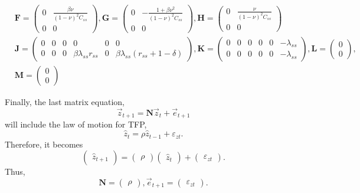 \documentclass[11pt]{article}
\numberwithin{equation}{section} %
\numberwithin{figure}{section} %
\numberwithin{table}{section} %
\theoremstyle{definition}
\begin{document}
\begin{align*}
    &\mathbf{F} = \begin{pmatrix}
        0 & \frac{\beta \nu}{(1 - \nu)^2 C_{ss}} \\
        0 & 0
    \end{pmatrix}, \mathbf{G} = \begin{pmatrix}
        0 & -\frac{1 + \beta \nu^2}{(1 - \nu)^2 C_{ss}} \\
        0 & 0
    \end{pmatrix}, \mathbf{H} = \begin{pmatrix}
        0 & \frac{\nu}{(1 - \nu)^2 C_{ss}} \\
        0 & 0
    \end{pmatrix} \\
    &\mathbf{J} = \begin{pmatrix}
        0 & 0 & 0 & 0 & 0 & 0 \\
        0 & 0 & 0 & \beta \lambda_{ss} r_{ss} & 0 & \beta \lambda_{ss} (r_{ss} + 1 - \delta)
    \end{pmatrix}, \mathbf{K} = \begin{pmatrix}
        0 & 0 & 0 & 0 & 0 & -\lambda_{ss} \\
        0 & 0 & 0 & 0 & 0 & -\lambda_{ss}
    \end{pmatrix}, \mathbf{L} = \begin{pmatrix}
        0 \\ 0
    \end{pmatrix}, \\
    &\mathbf{M} = \begin{pmatrix}
        0 \\ 0
    \end{pmatrix}
\end{align*}

Finally, the last matrix equation,
\[
    \vec{z}_{t+1} = \mathbf{N} \vec{z}_t + \vec{e}_{t+1}
\]
will include the law of motion for TFP,
\[
    \hat{z}_t = \rho \hat{z}_{t-1} + \varepsilon_{zt}.
\]
Therefore, it becomes
\[
    \begin{pmatrix}
        \hat{z}_{t+1}
    \end{pmatrix} = \begin{pmatrix}
        \rho
    \end{pmatrix} \begin{pmatrix}
        \hat{z}_t
    \end{pmatrix} + \begin{pmatrix}
        \varepsilon_{zt}
    \end{pmatrix}.
\]
Thus,
\[
    \mathbf{N} = \begin{pmatrix}
        \rho
    \end{pmatrix}, \vec{e}_{t+1} = \begin{pmatrix}
        \varepsilon_{zt}
    \end{pmatrix}.
\]
\end{document}
